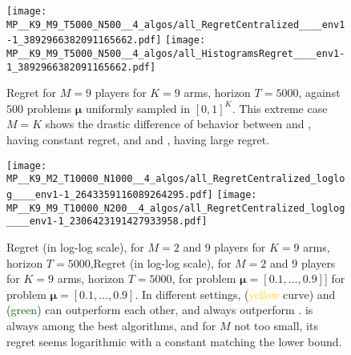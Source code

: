 \begin{figure}[!h]
  \centering
      \texttt{[image: MP\_\_K9\_M9\_T5000\_N500\_\_4\_algos/all\_RegretCentralized\_\_\_\_env1-1\_3892966382091165662.pdf]}
      \texttt{[image: MP\_\_K9\_M9\_T5000\_N500\_\_4\_algos/all\_HistogramsRegret\_\_\_\_env1-1\_3892966382091165662.pdf]}
  \caption[Regret for $M=9$ players for $K=9$ arms, horizon $T=5000$, against $500$ problems $\boldsymbol{\mu}$ uniformly sampled]{Regret for $M=9$ players for $K=9$ arms, horizon $T=5000$, against $500$ problems $\boldsymbol{\mu}$ uniformly sampled in $[0,1]^K$. This extreme case $M=K$ shows the drastic difference of behavior between \RandTopM{} and \MCTopM, having constant regret, and \rhoRand{} and \Selfish, having large regret.}
  \label{fig:5:MP__K9_M9_T5000_N500__4_algos__all_HistogramsRegret}
\end{figure}


\begin{figure}[!h]
  \centering
      \texttt{[image: MP\_\_K9\_M2\_T10000\_N1000\_\_4\_algos/all\_RegretCentralized\_loglog\_\_\_\_env1-1\_2643359116089264295.pdf]}
      \texttt{[image: MP\_\_K9\_M9\_T10000\_N200\_\_4\_algos/all\_RegretCentralized\_loglog\_\_\_\_env1-1\_2306423191427933958.pdf]}
  \caption[Regret for $M=2$ and $9$ players for $K=9$ arms, horizon $T=5000$, for a fixed problem]{Regret (in log-log scale), for $M=2$ and $9$ players for $K=9$ arms, horizon $T=5000$,Regret (in log-log scale), for $M=2$ and $9$ players for $K=9$ arms, horizon $T=5000$, for problem $\boldsymbol{\mu}=[0.1,\dots,0.9]$] for problem $\boldsymbol{\mu}=[0.1,\dots,0.9]$. In different settings, \RandTopM{} (\textcolor{gold}{yellow} curve) and \Selfish{} (\textcolor{darkgreen}{green}) can outperform each other, and always outperform \rhoRand. \MCTopM{} is always among the best algorithms, and for $M$ not too small, its regret seems logarithmic with a constant matching the lower bound.}
  \label{fig:5:MP__K9_M2-6-9_T10000_N200__4_algos}
\end{figure}


